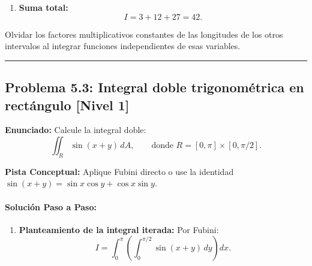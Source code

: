 \documentclass[11pt,a4paper]{article}
\begin{document}
\begin{enumerate}[label=\textbf{\arabic*.}]
\item \textbf{Suma total:}
\begin{equation*}
I = 3 + 12 + 27 = 42.
\end{equation*}
\end{enumerate}

\begin{trapbox}
Olvidar los factores multiplicativos constantes de las longitudes de los otros intervalos al integrar funciones independientes de esas variables.
\end{trapbox}

\vspace{0.5cm}
\hrule
\vspace{0.5cm}

\subsection*{Problema 5.3: Integral doble trigonométrica en rectángulo \hfill \color{primaryblue}\small[Nivel 1]}

\begin{tcolorbox}[colback=white,colframe=gray!40,arc=1mm,boxrule=0.5pt,left=3mm,right=3mm,top=2mm,bottom=2mm]
\textbf{Enunciado:} Calcule la integral doble:
\begin{equation*}
\iint_R \sin(x + y) \, dA, \qquad \text{donde } R = [0, \pi] \times [0, \pi/2].
\end{equation*}
\end{tcolorbox}

\begin{tcolorbox}[colback=yellow!4,colframe=accentamber!70,arc=1mm,boxrule=0.5pt,left=3mm,right=3mm,top=1.5mm,bottom=1.5mm]
\textbf{Pista Conceptual:} Aplique Fubini directo o use la identidad $\sin(x+y) = \sin x \cos y + \cos x \sin y$.
\end{tcolorbox}

\paragraph{Solución Paso a Paso:}\par
\begin{enumerate}[label=\textbf{\arabic*.}]
\item \textbf{Planteamiento de la integral iterada:}
Por Fubini:
\begin{equation*}
I = \int_0^\pi \left( \int_0^{\pi/2} \sin(x + y) \, dy \right) dx.
\end{equation*}
\end{enumerate}
\end{document}
